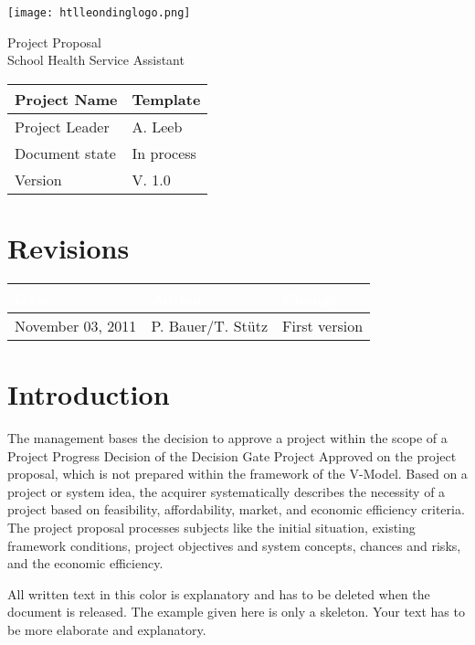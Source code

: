 \documentclass[12pt]{article}
\theoremstyle{definition}
\newenvironment{explanation}{%
   \setlength{\parindent}{0pt}
   \itshape
   \color{blue}
}{}
\newcommand{\projectname}{Template}
\newcommand{\productname}{School Health Service Assistant}
\newcommand{\projectleader}{A. Leeb}
\newcommand{\documentstatus}{In process}
\newcommand{\version}{V. 1.0}
\begin{document}
\begin{titlepage}
\begin{flushright}
\texttt{[image: htlleondinglogo.png]}\\
\end{flushright}

\vspace{10em}

\begin{center}
{\Huge Project Proposal} \\[3em]
{\LARGE \productname} \\[3em]
\end{center}

\begin{flushleft}
\begin{tabular}{|l|l|}
\hline
Project Name & \projectname \\ \hline
Project Leader & \projectleader \\ \hline
Document state & \documentstatus \\ \hline
Version & \version \\ \hline
\end{tabular}
\end{flushleft}

\end{titlepage}
\section*{Revisions}
\begin{tabular}{|l|l|l|}
\hline
\cellcolor[gray]{0.5}\textcolor{white}{Date} & \cellcolor[gray]{0.5}\textcolor{white}{Author} & \cellcolor[gray]{0.5}\textcolor{white}{Change} \\ \hline
November 03, 2011&P. Bauer/T. Stütz&First version \\ \hline
\end{tabular}
\pagebreak

\tableofcontents
\pagebreak

\section{Introduction}
\begin{explanation}
The management bases the decision to approve a project within the scope of a Project Progress Decision of the Decision Gate Project Approved on the project proposal, which is not prepared within the framework of the V-Model. Based on a project or system idea, the acquirer systematically describes the necessity of a project based on feasibility, affordability, market, and economic efficiency criteria.
The project proposal processes subjects like the initial situation, existing framework conditions, project objectives and system concepts, chances and risks, and the economic efficiency.

All written text in this color is explanatory and has to be deleted when the document is released. The example given here is only a skeleton. Your text has to be more elaborate and explanatory.
\end{explanation}
\pagebreak
\end{document}
